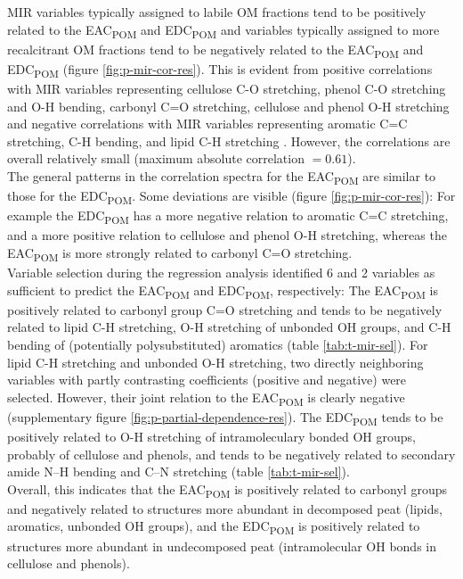 \documentclass[alpha-refs, lineno]{wiley-article-rmd}
\begin{document}
MIR variables typically assigned to labile OM fractions tend to be positively related to the EAC\textsubscript{POM} and EDC\textsubscript{POM} and variables typically assigned to more recalcitrant OM fractions tend to be negatively related to the EAC\textsubscript{POM} and EDC\textsubscript{POM} (figure \ref{fig:p-mir-cor-res}). This is evident from positive correlations with MIR variables representing cellulose C-O stretching, phenol C-O stretching and O-H bending, carbonyl C=O stretching, cellulose and phenol O-H stretching and negative correlations with MIR variables representing aromatic C=C stretching, C-H bending, and lipid C-H stretching \autocite{Stuart.2005,Cocozza.2003,Artz.2008,Kubo.2005,Schmidt.2006}. However, the correlations are overall relatively small (maximum absolute correlation \(=0.61\)).\\
The general patterns in the correlation spectra for the EAC\textsubscript{POM} are similar to those for the EDC\textsubscript{POM}. Some deviations are visible (figure \ref{fig:p-mir-cor-res}): For example the EDC\textsubscript{POM} has a more negative relation to aromatic C=C stretching, and a more positive relation to cellulose and phenol O-H stretching, whereas the EAC\textsubscript{POM} is more strongly related to carbonyl C=O stretching.\\
Variable selection during the regression analysis identified 6 and 2 variables as sufficient to predict the EAC\textsubscript{POM} and EDC\textsubscript{POM}, respectively: The EAC\textsubscript{POM} is positively related to carbonyl group C=O stretching and tends to be negatively related to lipid C-H stretching, O-H stretching of unbonded OH groups, and C-H bending of (potentially polysubstituted) aromatics (table \ref{tab:t-mir-sel}). For lipid C-H stretching and unbonded O-H stretching, two directly neighboring variables with partly contrasting coefficients (positive and negative) were selected. However, their joint relation to the EAC\textsubscript{POM} is clearly negative (supplementary figure \ref{fig:p-partial-dependence-res}). The EDC\textsubscript{POM} tends to be positively related to O-H stretching of intramoleculary bonded OH groups, probably of cellulose and phenols, and tends to be negatively related to secondary amide N--H bending and C--N stretching (table \ref{tab:t-mir-sel}).\\
Overall, this indicates that the EAC\textsubscript{POM} is positively related to carbonyl groups and negatively related to structures more abundant in decomposed peat (lipids, aromatics, unbonded OH groups), and the EDC\textsubscript{POM} is positively related to structures more abundant in undecomposed peat (intramolecular OH bonds in cellulose and phenols).
\end{document}
